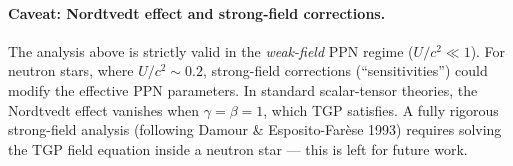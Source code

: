 \paragraph{Caveat: Nordtvedt effect and strong-field corrections.}
The analysis above is strictly valid in the \emph{weak-field}
PPN regime ($U/c^2 \ll 1$).  For neutron stars, where
$U/c^2 \sim 0.2$, strong-field corrections (``sensitivities'')
could modify the effective PPN parameters.  In standard
scalar-tensor theories, the Nordtvedt effect vanishes when
$\gamma = \beta = 1$, which TGP satisfies.
A fully rigorous strong-field analysis (following Damour \&
Esposito-Far\`ese 1993) requires solving the TGP field
equation inside a neutron star --- this is left for future work.
